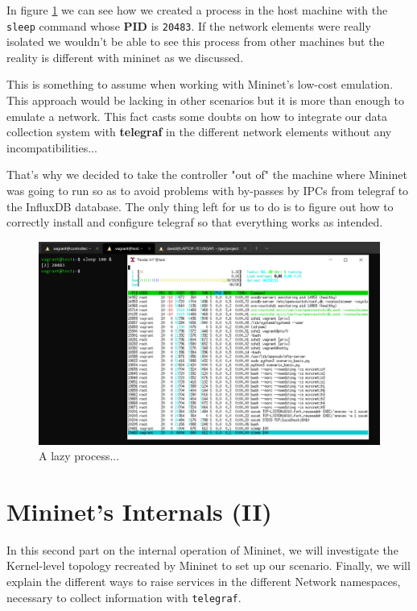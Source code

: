 \documentclass[12pt]{article}
\newcommand{\newpar} {
    \vskip 1cm
}
\begin{document}
        \newpar
		In figure \ref{f:x_htop} we can see how we created a process in the host machine with the \texttt{sleep} command whose \textbf{PID} is \texttt{20483}. If the network elements were really isolated we wouldn't be able to see this process from other machines but the reality is different with mininet as we discussed.
		\newpar
		This is something to assume when working with Mininet's low-cost emulation. This approach would be lacking in other scenarios but it is more than enough to emulate a network. This fact casts some doubts on how to integrate our data collection system with \textbf{telegraf} in the different network elements without any incompatibilities...
		\newpar
		That's why we decided to take the controller "out of" the machine where Mininet was going to run so as to avoid problems with by-passes by IPCs from telegraf to the InfluxDB database. The only thing left for us to do is to figure out how to correctly install and configure telegraf so that everything works as intended.
		\newpage

		\begin{figure}[!htb]
			\centering
			\includegraphics[width=\linewidth]{x_htop.png}
			\caption{A lazy process...}
			\label{f:x_htop}
		\end{figure}

\newpage

\section{Mininet's Internals (II)}
	In this second part on the internal operation of Mininet, we will investigate the Kernel-level topology recreated by Mininet to set up our scenario. Finally, we will explain the different ways to raise services in the different Network namespaces, necessary to collect information with \texttt{telegraf}. 
\end{document}
